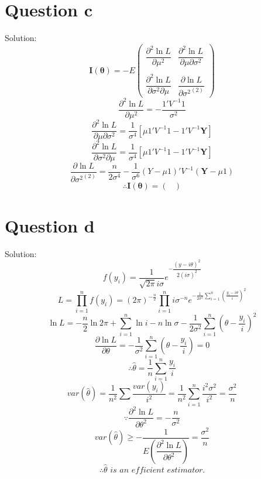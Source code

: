 \documentclass[a4papers]{ctexart}
\begin{document}
\section*{Question c}
\noindent Solution:
\[ \boldsymbol{I}(\boldsymbol{\theta}) = -E \begin{pmatrix}
    \dfrac {\partial ^{2}\ln L}{\partial \mu^2} 
    & \dfrac {\partial^{2}\ln L}{\partial \mu \partial \sigma ^{2}} \\ \\
    \dfrac {\partial ^{2}\ln L}{\partial \sigma ^{2}\partial \mu } 
    & \dfrac {\partial \ln L}{\partial {\sigma ^{2}}^{(2)} }
\end{pmatrix}\]
\[  \dfrac {\partial ^{2}\ln L}{\partial \mu^2 }=-\dfrac {1'V^{-1}1}{\sigma ^{2}} \]
\[ \dfrac {\partial^{2}\ln L}{\partial \mu \partial \sigma ^{2}}=\dfrac {1}{\sigma ^{4}}\left[ \mu 1'V^{-1}1-1'V^{-1}\boldsymbol{Y}\right] \]
\[ \dfrac {\partial ^{2}\ln L}{\partial \sigma ^{2}\partial \mu } = \dfrac {1}{\sigma ^{4}}\left[ \mu 1'V^{-1}1-1'V^{-1}\boldsymbol{Y}\right] \]
\[ \dfrac {\partial \ln L}{\partial {\sigma ^{2}}^{(2)} } =\dfrac {n}{2\sigma ^{4}}-\dfrac {1}{\sigma ^{6}}\left( Y-\mu 1\right) 'V^{-1}\left( \boldsymbol{Y}-\mu 1\right)  \]
\[ \therefore \boldsymbol{I}(\boldsymbol{\theta}) =\begin{pmatrix}

\end{pmatrix}  \]

\section*{Question d}
\noindent Solution:
\[ f\left( y_{i}\right) =\dfrac {1}{\sqrt {2\pi }i\sigma }e^{-\dfrac {\left( y-i\theta \right) ^{2}}{2\left( i\sigma \right) ^{2}}}\]
\[ L=\prod ^{n}_{i=1}f\left( y_{i}\right) =\left( 2\pi \right) ^{-\frac {n}{2}}\prod ^{n}_{i=1}i\sigma ^{-n}e^{-\frac {1}{2\sigma^2}\sum ^{n}_{i=1}\left( \frac {y_{i}-i\theta }{i}\right) ^{2}}\]
\[ \ln L=-\dfrac {n}{2}\ln 2\pi +\sum ^{n}_{i=1}\ln i-n\ln \sigma -\dfrac {1}{2\sigma ^{2}}\sum ^{n}_{i=1}\left( \theta -\dfrac {y_{i}}{i}\right) ^{2} \]
\[ \dfrac {\partial \ln L}{\partial \theta }=-\dfrac {1}{\sigma ^{2}}\sum ^{n}_{i=1}\left( \theta -\dfrac {y_{i}}{i}\right) =0\]
\[\therefore \hat {\theta }=\dfrac {1}{n}\sum ^{n}_{i=1}\dfrac {y_{i}}{i}\]
\[ var\left( \hat {\theta }\right) =\dfrac {1}{n^{2}}\sum \dfrac {var\left( y_{i}\right) }{i^{2}}=\dfrac {1}{n^{2}}\sum ^{n}_{i=1}\dfrac {i^{2}\sigma ^{2}}{i^{2}}=\dfrac{\sigma ^{2}}{n} \]
\[ \because \dfrac {\partial ^{2}\ln L}{\partial \theta ^{2}}=-\dfrac {n}{\sigma ^{2}}\]
\[var\left( \hat {\theta }\right) \geq -\dfrac {1}{E\left( \dfrac {\partial ^{2}\ln L}{\partial \theta ^{2}}\right) }=\dfrac {\sigma ^{2}}{n}\]
\[ \therefore \hat{\theta}\,\, is\,\, an\,\, efficient\,\, estimator.\]
\end{document}
